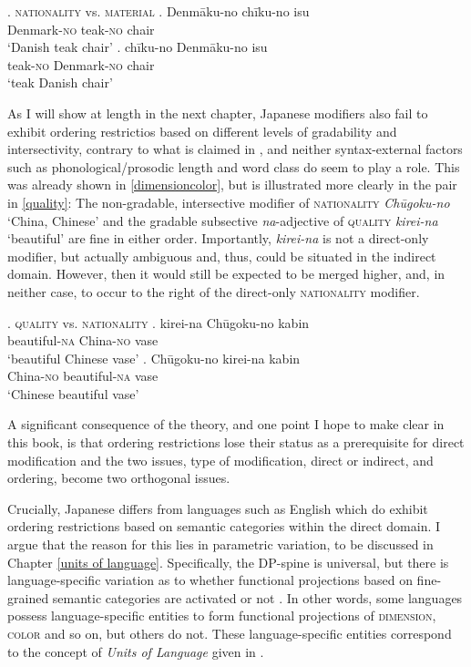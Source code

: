 \documentclass [output=book,colorlinks,citecolor=brown]{langscibook}
\begin{document}
\ex. \textsc{nationality} vs. \textsc{material} \label{nationality}
\ag. Denmāku-no chīku-no isu\\
Denmark-\textsc{no} teak-\textsc{no} chair\\
`Danish teak chair' \label{denmakuneu}
\bg. chīku-no Denmāku-no isu\\
teak-\textsc{no} Denmark-\textsc{no} chair\\
`teak Danish chair'

As I will show at length in the next chapter, Japanese modifiers also fail to exhibit ordering restrictios based on different levels of gradability and intersectivity, contrary to what is claimed in \citet{svenonius:2008:position, manzini:2025:left}, and neither syntax-external factors such as phonological/prosodic length and word class do seem to play a role. This was already shown in \ref{dimensioncolor}, but is illustrated more clearly in the pair in \ref{quality}: The non-gradable, intersective modifier of \textsc{nationality} \textit{Chūgoku-no} `China, Chinese' and the gradable subsective \textit{na}-adjective of \textsc{quality} \textit{kirei-na} `beautiful’ are fine in either order. Importantly, \textit{kirei-na} is not a direct-only modifier, but actually ambiguous and, thus, could be situated in the indirect domain. However, then it would still be expected to be merged higher, and, in neither case, to occur to the right of the direct-only \textsc{nationality} modifier. %

\ex. \textsc{quality} vs. \textsc{nationality} \label{quality}
\ag. kirei-na Chūgoku-no kabin\\
beautiful-\textsc{na} China-\textsc{no} vase\\
`beautiful Chinese vase'
\bg. Chūgoku-no kirei-na kabin\\
China-\textsc{no} beautiful-\textsc{na} vase\\
`Chinese beautiful vase'

A significant consequence of the theory, and one point I hope to make clear in this book, is that ordering restrictions lose their status as a prerequisite for direct modification and the two issues, type of modification, direct or indirect, and ordering, become two orthogonal issues.

Crucially, Japanese differs from languages such as English which do exhibit ordering restrictions based on semantic categories within the direct domain. I argue that the reason for this lies in parametric variation, to be discussed in Chapter \ref{units of language}. Specifically, the DP-spine is universal, but there is language-specific variation as to whether functional projections based on fine-grained semantic categories are activated or not \citep{ramchand:2014:deriving, wiltschko:2014:universal}. In other words, some languages possess language-specific entities to form functional projections of \textsc{dimension}, \textsc{color} and so on, but others do not. These language-specific entities correspond to the concept of \textit{Units of Language} given in \citet[1]{wiltschko:2014:universal}. %
\end{document}
